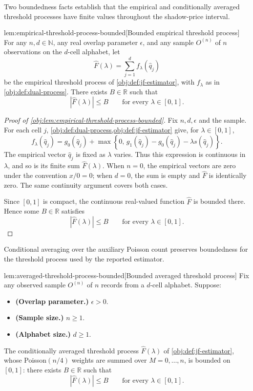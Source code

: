 \documentclass[11pt]{article}
\begin{document}
Two boundedness facts establish that the empirical and conditionally averaged threshold processes have finite values throughout the shadow-price interval.

\begin{lemmav}{lem:empirical-threshold-process-bounded}[Bounded empirical threshold process]
For any \(n,d\in\mathbb N\), any real overlap parameter \(\epsilon\), and any sample \(O^{(n)}\) of \(n\) observations on the \(d\)-cell alphabet, let
\[
\widehat F(\lambda)=\sum_{j=1}^{d}f_\lambda(\widehat q_j)
\]
be the empirical threshold process of \cref{obj:def:jf-estimator}, with \(f_\lambda\) as in \cref{obj:def:dual-process}. There exists \(B\in\mathbb R\) such that
\[
|\widehat F(\lambda)|\leq B
\qquad\text{for every }\lambda\in[0,1].
\]
\end{lemmav}

\begin{proof}[Proof of \cref{obj:lem:empirical-threshold-process-bounded}]
Fix \(n,d,\epsilon\) and the sample. For each cell \(j\), \cref{obj:def:dual-process,obj:def:jf-estimator} give, for \(\lambda\in[0,1]\),
\[
f_\lambda(\widehat q_j)
=
g_0(\widehat q_j)
+
\max\!\left\{0,\,
g_1(\widehat q_j)-g_0(\widehat q_j)
-\lambda s(\widehat q_j)\right\}.
\]
The empirical vector \(\widehat q_j\) is fixed as \(\lambda\) varies. Thus this expression is continuous in \(\lambda\), and so is its finite sum \(\widehat F(\lambda)\). When \(n=0\), the empirical vectors are zero under the convention \(x/0=0\); when \(d=0\), the sum is empty and \(\widehat F\) is identically zero. The same continuity argument covers both cases. %

Since \([0,1]\) is compact, the continuous real-valued function \(\widehat F\) is bounded there. Hence some \(B\in\mathbb R\) satisfies
\[
|\widehat F(\lambda)|\leq B
\qquad\text{for every }\lambda\in[0,1].
\]
\end{proof}

Conditional averaging over the auxiliary Poisson count preserves boundedness for the threshold process used by the reported estimator.

\begin{lemmav}{lem:averaged-threshold-process-bounded}[Bounded averaged threshold process]
Fix any observed sample \(O^{(n)}\) of \(n\) records from a \(d\)-cell alphabet. Suppose:
\begin{itemize}
\item \textbf{(Overlap parameter.)} \(\epsilon>0\).
\item \textbf{(Sample size.)} \(n\geq 1\).
\item \textbf{(Alphabet size.)} \(d\geq 1\).
\end{itemize}
The conditionally averaged threshold process \(\widehat F(\lambda)\) of \cref{obj:def:jf-estimator}, whose Poisson\((n/4)\) weights are summed over \(M=0,\ldots,n\), is bounded on \([0,1]\): there exists \(B\in\mathbb R\) such that
\[
|\widehat F(\lambda)|\leq B
\qquad\text{for every }\lambda\in[0,1].
\]
\end{lemmav}
\end{document}
